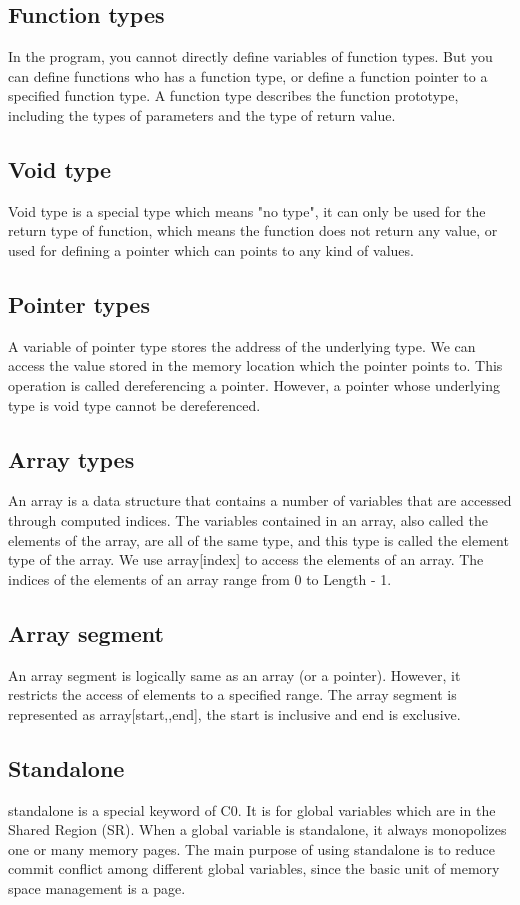 \documentclass[a4paper]{article}
\begin{document}
\subsection{Function types}
In the program, you cannot directly define variables of function types. But you can define functions who has a function type, or define a function pointer to a specified function type.
A function type describes the function prototype, including the types of parameters and the type of return value.

\subsection{Void type}
Void type is a special type which means "no type", it can only be used for the return type of function, which means the function does not return any value, or used for defining a pointer which can points to any kind of values.

\subsection{Pointer types}
A variable of pointer type stores the address of the underlying type. We can access the value stored in the memory location which the pointer points to. This operation is called dereferencing a pointer. However, a pointer whose underlying type is void type cannot be dereferenced. 

\subsection{Array types}
An array is a data structure that contains a number of variables that are accessed through computed indices. The variables contained in an array, also called the elements of the array, are all of the same type, and this type is called the element type of the array. We use array[index] to access the elements of an array. The indices of the elements of an array range from 0 to Length - 1. 

\subsection{Array segment}
An array segment is logically same as an array (or a pointer). However, it restricts the access of elements to a specified range. The array segment is represented as array[start,,end], the start is inclusive and end is exclusive.

\subsection{Standalone}
standalone is a special keyword of C0. It is for global variables which are in the Shared Region (SR). When a global variable is standalone, it always monopolizes one or many memory pages. The main purpose of using standalone is to reduce commit conflict among different global variables, since the basic unit of memory space management is a page.
\end{document}
